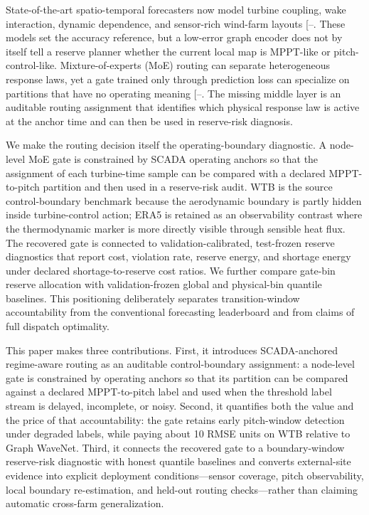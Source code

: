 \documentclass[
  11pt]{article}
\begin{document}
State-of-the-art spatio-temporal forecasters now model turbine coupling,
wake interaction, dynamic dependence, and sensor-rich wind-farm layouts
{[}--\citeproc{ref-daenens2025offshore}{5}{]}.
These models set the accuracy reference, but a low-error graph encoder
does not by itself tell a reserve planner whether the current local map
is MPPT-like or pitch-control-like. Mixture-of-experts (MoE) routing can
separate heterogeneous response laws, yet a gate trained only through
prediction loss can specialize on partitions that have no operating
meaning
{[}--\citeproc{ref-shi2025timemoe}{10}{]}.
The missing middle layer is an auditable routing assignment that
identifies which physical response law is active at the anchor time and
can then be used in reserve-risk diagnosis.

We make the routing decision itself the operating-boundary diagnostic. A
node-level MoE gate is constrained by SCADA operating anchors so that
the assignment of each turbine-time sample can be compared with a
declared MPPT-to-pitch partition and then used in a reserve-risk audit.
WTB is the source control-boundary benchmark because the aerodynamic
boundary is partly hidden inside turbine-control action; ERA5 is
retained as an observability contrast where the thermodynamic marker is
more directly visible through sensible heat flux. The recovered gate is
connected to validation-calibrated, test-frozen reserve diagnostics that
report cost, violation rate, reserve energy, and shortage energy under
declared shortage-to-reserve cost ratios. We further compare gate-bin
reserve allocation with validation-frozen global and physical-bin
quantile baselines. This positioning deliberately separates
transition-window accountability from the conventional forecasting
leaderboard and from claims of full dispatch optimality.

This paper makes three contributions. First, it introduces
SCADA-anchored regime-aware routing as an auditable control-boundary
assignment: a node-level gate is constrained by operating anchors so
that its partition can be compared against a declared MPPT-to-pitch
label and used when the threshold label stream is delayed, incomplete,
or noisy. Second, it quantifies both the value and the price of that
accountability: the gate retains early pitch-window detection under
degraded labels, while paying about 10 RMSE units on WTB relative to
Graph WaveNet. Third, it connects the recovered gate to a
boundary-window reserve-risk diagnostic with honest quantile baselines
and converts external-site evidence into explicit deployment
conditions---sensor coverage, pitch observability, local boundary
re-estimation, and held-out routing checks---rather than claiming
automatic cross-farm generalization.
\end{document}
